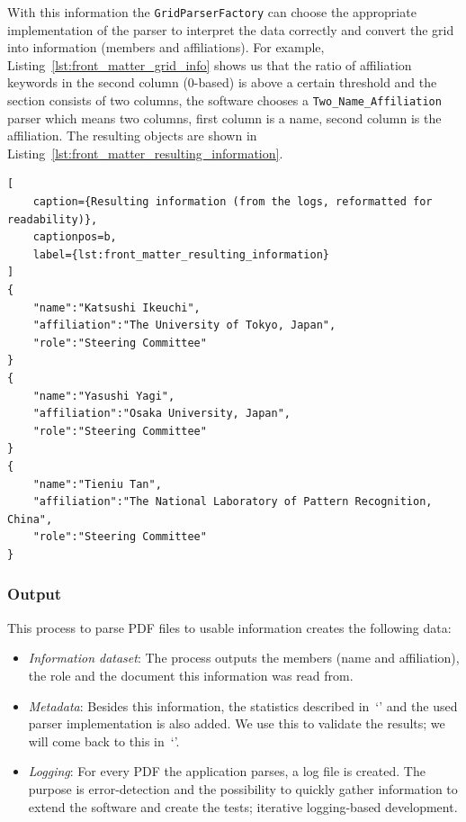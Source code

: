 \documentclass{ou-report}
\begin{document}
With this information the \verb|GridParserFactory| can choose the appropriate 
implementation of the parser to interpret the data correctly and 
convert the grid into information (members and affiliations). 
%
For example, Listing~\ref{lst:front_matter_grid_info} shows us that 
the ratio of affiliation keywords in the second column (0-based) is 
above a certain threshold and the section consists of two columns, the software 
chooses a \verb|Two_Name_Affiliation| parser which means two columns, first column is a 
name, second column is the affiliation.
%
The resulting objects are shown in 
Listing~\ref{lst:front_matter_resulting_information}.
\begin{lstlisting}[
    caption={Resulting information (from the logs, reformatted for readability)},
    captionpos=b,
    label={lst:front_matter_resulting_information}
]
{
    "name":"Katsushi Ikeuchi",
    "affiliation":"The University of Tokyo, Japan",
    "role":"Steering Committee"
}
{
    "name":"Yasushi Yagi",
    "affiliation":"Osaka University, Japan",
    "role":"Steering Committee"
}
{
    "name":"Tieniu Tan",
    "affiliation":"The National Laboratory of Pattern Recognition, China",
    "role":"Steering Committee"
}
\end{lstlisting}


\subsubsection{Output}
This process to parse PDF files to usable information creates the 
following data:
\begin{itemize}
    \item \emph{Information dataset}: The process outputs the members (name
        and affiliation), the role and the document this information was read 
        from.
    \item \emph{Metadata}: Besides this information, the statistics described in~`' and the used parser 
        implementation is also added. We use this to validate the results; we will come back to this in~`'.
    \item \emph{Logging}: For every PDF the application parses, a log file is created.
        The purpose is error-detection and the possibility to quickly gather 
        information to extend the software and create the tests; iterative 
        logging-based development.
\end{itemize}
\end{document}
